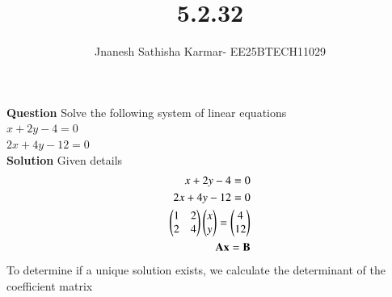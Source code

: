 \documentclass[journal]{IEEEtran}
\theoremstyle{remark}
\begin{document}
\setlength{\abovedisplayskip}{0pt}
\setlength{\belowdisplayskip}{0pt}
\setlength{\abovedisplayshortskip}{0pt}
\setlength{\belowdisplayshortskip}{0pt}

\onecolumn

\title{5.2.32}
\author{Jnanesh Sathisha Karmar- EE25BTECH11029}
\maketitle


\renewcommand{\thefigure}{\theenumi}
\renewcommand{\thetable}{\theenumi}

\textbf{Question} Solve the following system of linear equations\\$x+2y-4=0$\\$2x+4y-12=0$\\
\textbf{Solution} Given details\\
\begin{align}
    x+2y-4=0\\
    2x+4y-12=0\\
    \begin{pmatrix}1&2\\2&4\end{pmatrix}\begin{pmatrix}x\\y\end{pmatrix}=\begin{pmatrix}4\\12\end{pmatrix}\\
    \mathbf{A}\mathbf{x}=\mathbf{B}
\end{align}
To determine if a unique solution exists, we calculate the determinant of the coefficient matrix
\end{document}
